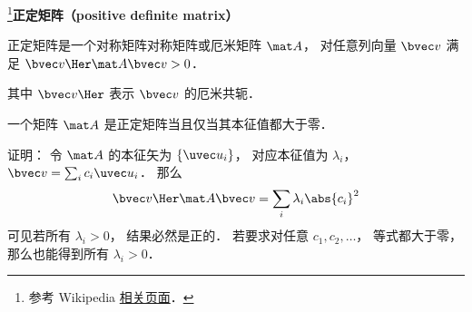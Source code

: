

\footnote{参考 Wikipedia \href{https://en.wikipedia.org/wiki/Definite_matrix}{相关页面}．}\textbf{正定矩阵（positive definite matrix）}
\begin{definition}{}
正定矩阵是一个对称矩阵对称矩阵或厄米矩阵 $\mat A$， 对任意列向量 $\bvec v$ 满足 $\bvec v\Her \mat A \bvec v > 0$．
\end{definition}
其中 $\bvec v\Her$ 表示 $\bvec v$ 的厄米共轭．

\begin{theorem}{}
一个矩阵 $\mat A$ 是正定矩阵当且仅当其本征值都大于零．
\end{theorem}

证明： 令 $\mat A$ 的本征矢为 $\{\uvec u_i\}$， 对应本征值为 $\lambda_i$， $\bvec v = \sum_i c_i \uvec u_i$． 那么
\begin{equation}
\bvec v\Her \mat A \bvec v = \sum_i \lambda_i \abs{c_i}^2
\end{equation}
可见若所有 $\lambda_i > 0$， 结果必然是正的． 若要求对任意 $c_1,c_2,\dots$， 等式都大于零， 那么也能得到所有 $\lambda_i > 0$．
